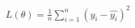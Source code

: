 \documentclass[preview]{standalone}
\begin{document}
\begin{align*}
L(\theta) = \frac{1}{n}\sum_{i=1}^{n}(y_i - \hat{y_i})^2
\end{align*}
\end{document}
